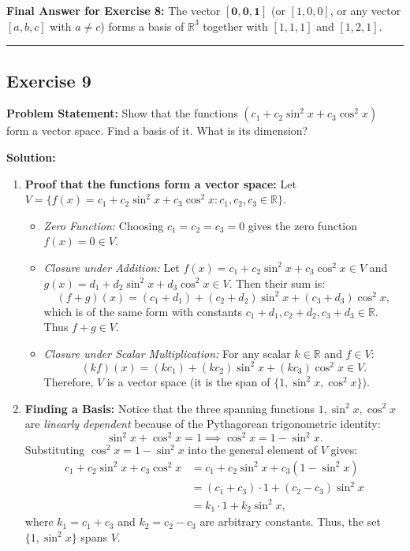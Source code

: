 \documentclass[11pt,a4paper]{article}
\begin{document}
\textbf{Final Answer for Exercise 8:} The vector $\mathbf{[0, 0, 1]}$ (or $[1, 0, 0]$, or any vector $[a, b, c]$ with $a \neq c$) forms a basis of $\mathbb{R}^3$ together with $[1, 1, 1]$ and $[1, 2, 1]$.

\bigskip
\hrule
\bigskip

\subsection*{Exercise 9}
\textbf{Problem Statement:} Show that the functions $(c_1 + c_2 \sin^2 x + c_3 \cos^2 x)$ form a vector space. Find a basis of it. What is its dimension?

\textbf{Solution:}
\begin{enumerate}
    \item \textbf{Proof that the functions form a vector space:}
    Let $V = \{f(x) = c_1 + c_2 \sin^2 x + c_3 \cos^2 x : c_1, c_2, c_3 \in \mathbb{R}\}$.
    \begin{itemize}
        \item \emph{Zero Function:} Choosing $c_1 = c_2 = c_3 = 0$ gives the zero function $f(x) = 0 \in V$.
        \item \emph{Closure under Addition:} Let $f(x) = c_1 + c_2 \sin^2 x + c_3 \cos^2 x \in V$ and $g(x) = d_1 + d_2 \sin^2 x + d_3 \cos^2 x \in V$. Then their sum is:
        \[
            (f + g)(x) = (c_1 + d_1) + (c_2 + d_2)\sin^2 x + (c_3 + d_3)\cos^2 x,
        \]
        which is of the same form with constants $c_1 + d_1, c_2 + d_2, c_3 + d_3 \in \mathbb{R}$. Thus $f + g \in V$.
        \item \emph{Closure under Scalar Multiplication:} For any scalar $k \in \mathbb{R}$ and $f \in V$:
        \[
            (kf)(x) = (kc_1) + (kc_2)\sin^2 x + (kc_3)\cos^2 x \in V.
        \]
        Therefore, $V$ is a vector space (it is the span of $\{1, \sin^2 x, \cos^2 x\}$).
    \end{itemize}

    \item \textbf{Finding a Basis:}
    Notice that the three spanning functions $1, \sin^2 x, \cos^2 x$ are \emph{linearly dependent} because of the Pythagorean trigonometric identity:
    \[
        \sin^2 x + \cos^2 x = 1 \implies \cos^2 x = 1 - \sin^2 x.
    \]
    Substituting $\cos^2 x = 1 - \sin^2 x$ into the general element of $V$ gives:
    \begin{align*}
        c_1 + c_2 \sin^2 x + c_3 \cos^2 x &= c_1 + c_2 \sin^2 x + c_3(1 - \sin^2 x) \\
        &= (c_1 + c_3)\cdot 1 + (c_2 - c_3)\sin^2 x \\
        &= k_1 \cdot 1 + k_2 \sin^2 x,
    \end{align*}
    where $k_1 = c_1 + c_3$ and $k_2 = c_2 - c_3$ are arbitrary constants. Thus, the set $\{1, \sin^2 x\}$ spans $V$.
    

\end{enumerate}
\end{document}
